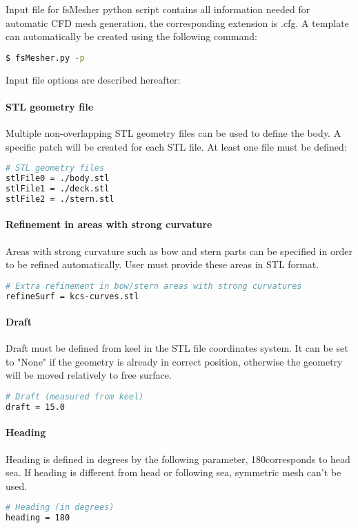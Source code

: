 Input file for fsMesher python script contains all information needed for automatic CFD mesh generation, the corresponding extension is .cfg. A template can automatically be created using the following command:
\begin{lstlisting}[language=bash]
$ fsMesher.py -p
\end{lstlisting}

Input file options are described hereafter:
\paragraph{STL geometry file}
Multiple non-overlapping STL geometry files can be used to define the body. A specific patch will be created for each STL file. At least one file must be defined:
\begin{lstlisting}[language=bash]
# STL geometry files
stlFile0 = ./body.stl
stlFile1 = ./deck.stl
stlFile2 = ./stern.stl
\end{lstlisting}

\paragraph{Refinement in areas with strong curvature}
Areas with strong curvature such as bow and stern parts can be specified in order to be refined automatically. User must provide these areas in STL format.
\begin{lstlisting}[language=bash]
# Extra refinement in bow/stern areas with strong curvatures
refineSurf = kcs-curves.stl
\end{lstlisting}

\paragraph{Draft}
Draft must be defined from keel in the STL file coordinates system. It can be set to "None" if the geometry is already in correct position, otherwise the geometry will be moved relatively to free surface.
\begin{lstlisting}[language=bash]
# Draft (measured from keel)
draft = 15.0
\end{lstlisting}

\paragraph{Heading}
Heading is defined in degrees by the following parameter, 180\degree  corresponds to head sea. If heading is different from head or following sea, symmetric mesh can't be used.
\begin{lstlisting}[language=bash]
# Heading (in degrees)
heading = 180
\end{lstlisting}


